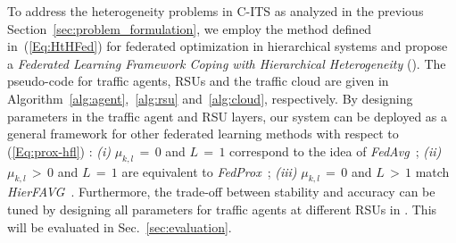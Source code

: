 To address the heterogeneity problems in C-ITS as analyzed in the previous Section~\ref{sec:problem_formulation}, we employ the method defined in~(\ref{Eq:HtHFed}) for federated optimization in hierarchical systems and propose a \emph{Federated Learning Framework Coping with Hierarchical Heterogeneity} ({\myHFed}). The pseudo-code for traffic agents, RSUs and the traffic cloud are given in Algorithm~\ref{alg:agent},~\ref{alg:rsu} and~\ref{alg:cloud}, respectively. By designing parameters in the traffic agent and RSU layers, our {\myHFed} system can be deployed as a general framework for other federated learning methods with respect to (\ref{Eq:prox-hfl}) : \emph{(i)} $\mu_{k,l}\,=\,0$ and $L\,=\,1$ correspond to the idea of \emph{FedAvg}~\cite{pmlr-v54-mcmahan17a}; \emph{(ii)} $\mu_{k,l}\,>\,0$ and $L\,=\,1$ are equivalent to \emph{FedProx}~\cite{li2020federated}; \emph{(iii)} $\mu_{k,l}\,=\,0$ and $L\,>\,1$ match \emph{HierFAVG}~\cite{9148862}. Furthermore, the trade-off between stability and accuracy can be tuned by designing all parameters for traffic agents at different RSUs in {\myHFed}. This will be evaluated in Sec.~\ref{sec:evaluation}.



